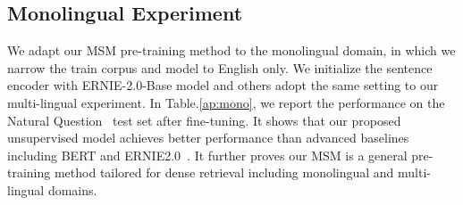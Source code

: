 \begin{table*}[t]
\centering
{}
\caption{ Performance comparison to MT-Based Cross-lingual Retrieval on \xor across languages. We report R@2k and R@5k results.}
\label{tab:mt}
\end{table*}



\subsection{Monolingual Experiment }
\label{ap:monolingual}
We adapt our MSM pre-training method to the monolingual domain, in which we narrow the train corpus and model to English only. We initialize the sentence encoder with ERNIE-2.0-Base model and others adopt the same setting to our multi-lingual experiment. In Table.\ref{ap:mono}, we report the performance on the Natural Question~\citep{kwiatkowski-etal-2019-natural} test set after fine-tuning. It shows that our proposed unsupervised model achieves better performance than advanced baselines including BERT and ERNIE2.0~\citep{sun2020ernie2.0}. It further proves our MSM is a general pre-training method tailored for dense retrieval including monolingual and multi-lingual domains. 


